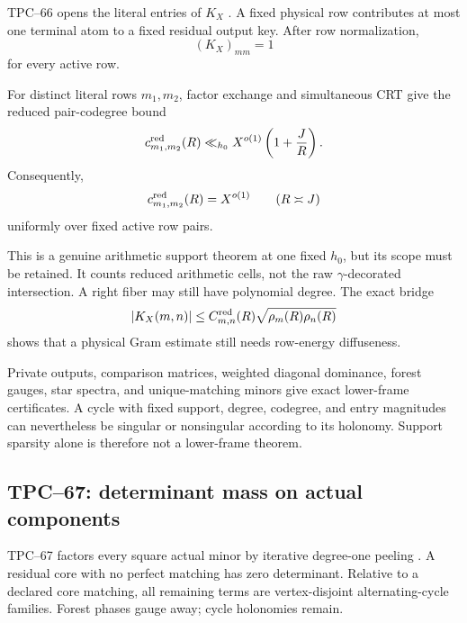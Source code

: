 TPC--66 opens the literal entries of \(K_X\) \citep{WangTPC66}.  A fixed
physical row contributes at most one terminal atom to a fixed residual
output key.  After row normalization,
\begin{equation}
 (K_X)_{mm}=1
 \label{eq:tpc72-unit-diagonal}
\end{equation}
for every active row.

For distinct literal rows \(m_1,m_2\), factor exchange and simultaneous CRT
give the reduced pair-codegree bound
\begin{equation}
 c^{\rm red}_{m_1,m_2}(R)
 \ll_{h_0}
 X^{o(1)}\left(1+\frac{J}{R}\right).
 \label{eq:tpc72-codegree}
\end{equation}
Consequently,
\begin{equation}
 c^{\rm red}_{m_1,m_2}(R)=X^{o(1)}
 \qquad(R\asymp J)
 \label{eq:tpc72-critical-codegree}
\end{equation}
uniformly over fixed active row pairs.

This is a genuine arithmetic support theorem at one fixed \(h_0\), but its
scope must be retained.  It counts reduced arithmetic cells, not the raw
\(\gamma\)-decorated intersection.  A right fiber may still have polynomial
degree.  The exact bridge
\begin{equation}
 |K_X(m,n)|
 \le
 C_{m,n}^{\rm red}(R)
 \sqrt{\rho_m(R)\rho_n(R)}
 \label{eq:tpc72-codegree-diffuseness}
\end{equation}
shows that a physical Gram estimate still needs row-energy diffuseness.

Private outputs, comparison matrices, weighted diagonal dominance, forest
gauges, star spectra, and unique-matching minors give exact lower-frame
certificates.  A cycle with fixed support, degree, codegree, and entry
magnitudes can nevertheless be singular or nonsingular according to its
holonomy.  Support sparsity alone is therefore not a lower-frame theorem.

\subsection{TPC--67: determinant mass on actual components}

TPC--67 factors every square actual minor by iterative degree-one peeling
\citep{WangTPC67}.  A residual core with no perfect matching has zero
determinant.  Relative to a declared core matching, all remaining terms are
vertex-disjoint alternating-cycle families.  Forest phases gauge away;
cycle holonomies remain.

